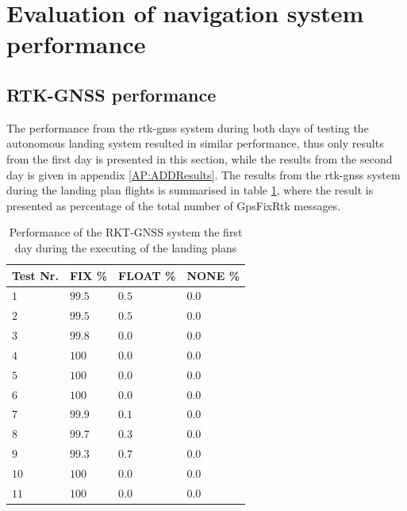 \section{Evaluation of navigation system performance}\label{ss:NavigationResults}
\subsection{RTK-GNSS performance}
The performance from the \gls{rtk-gnss} system during both days of testing the autonomous landing system resulted in similar performance, thus only results from the first day is presented in this section, while the results from the second day is given in appendix \ref{AP:ADDResults}. The results from the \gls{rtk-gnss} system during the landing plan flights is summarised in table \ref{TB:RTKFirstDayRTK}, where the result is presented as percentage of the total number of GpsFixRtk messages.
\begin{table}[H]
\centering
\begin{tabular}{| l | l | l | l |}
\hline
\textbf{Test Nr.}	& \textbf{FIX \%}	& \textbf{FLOAT \%}	& \textbf{NONE \%}	\\ \hline
$1$				& $99.5 $	& $0.5$	& $0.0$									\\ \hline
$2$				& $99.5 $	& $0.5$	& $0.0$									\\ \hline
$3$				& $99.8 $	& $0.0$	& $0.0$									\\ \hline
$4$				& $100$		& $0.0$	& $0.0$									\\ \hline
$5$				& $100$		& $0.0$	& $0.0$									\\ \hline
$6$				& $100$		& $0.0$	& $0.0$									\\ \hline
$7$				& $99.9$	& $0.1$	& $0.0$									\\ \hline
$8$				& $99.7 $ 	& $0.3$	& $0.0$									\\ \hline
$9$				& $99.3$	& $0.7$	& $0.0$									\\ \hline
$10$			& $100$		& $0.0$	& $0.0$									\\ \hline
$11$			& $100$		& $0.0$	& $0.0$									\\ \hline
\end{tabular}
\caption{Performance of the RKT-GNSS system the first day during the executing of the landing plans}
\label{TB:RTKFirstDayRTK}
\end{table}
